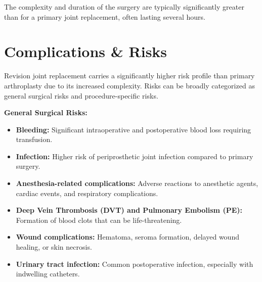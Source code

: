 The complexity and duration of the surgery are typically significantly greater than for a primary joint replacement, often lasting several hours.

\section*{Complications \& Risks}
Revision joint replacement carries a significantly higher risk profile than primary arthroplasty due to its increased complexity. Risks can be broadly categorized as general surgical risks and procedure-specific risks.

\textbf{General Surgical Risks:}
\begin{itemize}
  \item \textbf{Bleeding:} Significant intraoperative and postoperative blood loss requiring transfusion.
  
  \item \textbf{Infection:} Higher risk of periprosthetic joint infection compared to primary surgery.
  
  \item \textbf{Anesthesia-related complications:} Adverse reactions to anesthetic agents, cardiac events, and respiratory complications.
  
  \item \textbf{Deep Vein Thrombosis (DVT) and Pulmonary Embolism (PE):} Formation of blood clots that can be life-threatening.
  
  \item \textbf{Wound complications:} Hematoma, seroma formation, delayed wound healing, or skin necrosis.
  
  \item \textbf{Urinary tract infection:} Common postoperative infection, especially with indwelling catheters.
\end{itemize}

